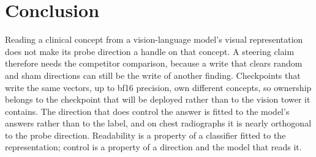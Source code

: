 \section{Conclusion}
\label{sec:conclusion}

Reading a clinical concept from a vision-language model's visual representation does not make its probe direction a handle on that concept. A steering claim therefore needs the competitor comparison, because a write that clears random and sham directions can still be the write of another finding. Checkpoints that write the same vectors, up to bf16 precision, own different concepts, so ownership belongs to the checkpoint that will be deployed rather than to the vision tower it contains. The direction that does control the answer is fitted to the model's answers rather than to the label, and on chest radiographs it is nearly orthogonal to the probe direction. Readability is a property of a classifier fitted to the representation; control is a property of a direction and the model that reads it.
